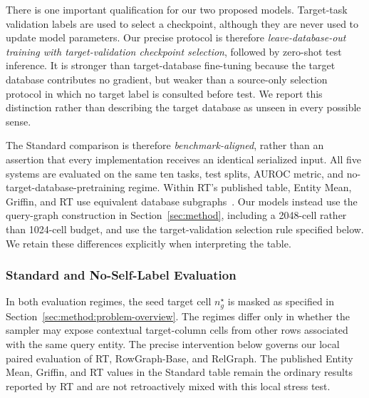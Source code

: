 There is one important qualification for our two proposed models.
Target-task validation labels are used to select a checkpoint, although
they are never used to update model parameters. Our precise protocol is therefore
\emph{leave-database-out training with target-validation checkpoint
selection}, followed by zero-shot test inference. It is stronger than
target-database fine-tuning because the target database contributes no
gradient, but weaker than a source-only selection protocol in which no
target label is consulted before test. We report this distinction rather
than describing the target database as unseen in every possible sense.

The Standard comparison is therefore \emph{benchmark-aligned}, rather than
an assertion that every implementation receives an identical serialized
input. All five systems are evaluated on the same ten tasks, test splits,
AUROC metric, and no-target-database-pretraining regime. Within RT's
published table, Entity Mean, Griffin, and RT use equivalent database
subgraphs~\citep{ranjan2026rt}. Our models instead use the query-graph
construction in Section~\ref{sec:method}, including a 2048-cell rather than
1024-cell budget, and use the target-validation selection rule specified
below. We retain these differences explicitly when interpreting the table.

\subsubsection{Standard and No-Self-Label Evaluation}
\label{sec:exp:nsl-protocol}

In both evaluation regimes, the seed target cell \(n_g^\star\) is masked as
specified in Section~\ref{sec:method:problem-overview}. The regimes differ
only in whether the sampler may expose contextual target-column cells from
other rows associated with the same query entity. The precise intervention
below governs our local paired evaluation of RT, RowGraph-Base, and RelGraph.
The published Entity Mean, Griffin, and RT values in the Standard table
remain the ordinary results reported by RT and are not retroactively mixed
with this local stress test.

